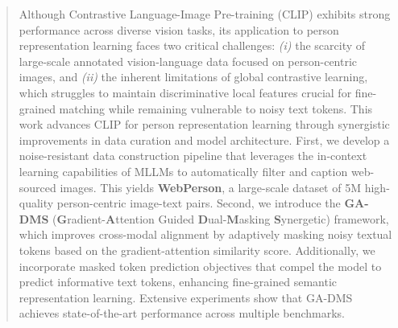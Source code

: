 \begin{abstract}
Although Contrastive Language-Image Pre-training (CLIP) exhibits strong performance across diverse vision tasks, its application to person representation learning faces two critical challenges: \textit{(i)} the scarcity of large-scale annotated vision-language data focused on person-centric images, and \textit{(ii)} the inherent limitations of global contrastive learning, which struggles to maintain discriminative local features crucial for fine-grained matching while remaining vulnerable to noisy text tokens. This work advances CLIP for person representation learning through synergistic improvements in data curation and model architecture. First, we develop a noise-resistant data construction pipeline that leverages the in-context learning capabilities of MLLMs to automatically filter and caption web-sourced images. This yields \textbf{WebPerson}, a large-scale dataset of 5M high-quality person-centric image-text pairs. Second, we introduce the \textbf{GA-DMS} (\textbf{G}radient-\textbf{A}ttention Guided \textbf{D}ual-\textbf{M}asking \textbf{S}ynergetic) framework, which improves cross-modal alignment by adaptively masking noisy textual tokens based on the gradient-attention similarity score. Additionally, we incorporate masked token prediction objectives that compel the model to predict informative text tokens, enhancing fine-grained semantic representation learning. Extensive experiments show that GA-DMS achieves state-of-the-art performance across multiple benchmarks. 

\end{abstract}